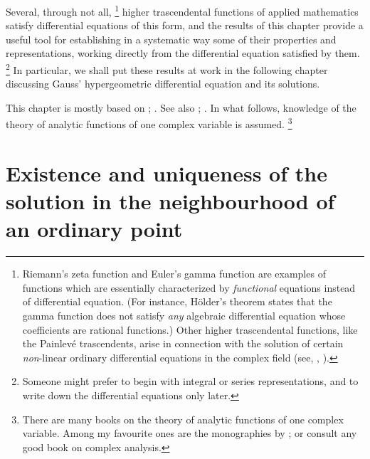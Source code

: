 Several, through  not all,%
\footnote{Riemann's zeta function and Euler's gamma function are examples of
   functions which are essentially characterized by \emph{functional} equations
   instead of differential equation.  (For instance, H\"older's theorem states that
   the gamma function does not satisfy \emph{any} algebraic differential equation
   whose coefficients are rational functions.) Other higher trascendental
   functions, like the Painlev\'e trascendents, arise in connection with the
   solution of certain \emph{non}-linear ordinary differential equations in the
   complex field (see, \eg, \textcite{Ince:1956}).}
   higher trascendental functions of applied
mathematics satisfy differential equations of this form,
   and the results of this chapter
provide a useful  tool for establishing in a systematic way some of their
properties and representations, working directly from the differential
equation satisfied by them.%
\footnote{Someone might prefer to begin
   with integral or series representations, 
   and to write down the differential
   equations only later.} In particular, we shall put these
results at work in the following chapter discussing Gauss' hypergeometric
differential equation and its solutions.

This chapter is mostly based on \textcite[\S~V]{Tricomi:1961};
\textcite[\S~2]{Wang.Guo:1989}. See also \textcite[\S~V]{Smirnov:1964};
\textcite[\S~X]{Whittaker.Watson:1927}.  In what follows, knowledge of
the theory of analytic  functions of one complex variable is assumed.%
\footnote{%
   There are many books on the theory of analytic functions of one complex
   variable.  Among my favourite ones are the monographies by
   \textcite{Ablowitz.Fokas:2003,Stein.Shakarchi:2003,Marsden.Hoffman:1987,Greene.Krantz:2006};
   or consult any good book on complex analysis.}



\section[Solution in the neighbourhood of an ordinary point]{Existence and
   uniqueness of the solution in the neighbourhood of an ordinary
   point}\label{sec:existence}



